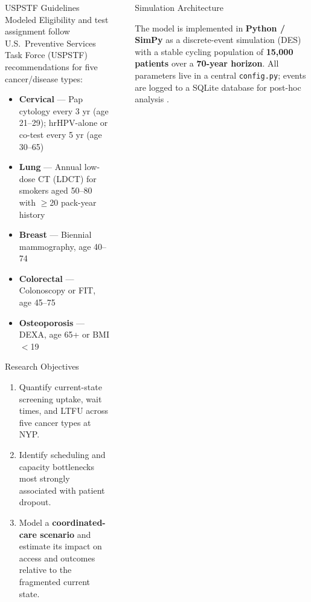 \documentclass[final]{beamer}
\newlength{\sepwidth}
\newlength{\colwidth}
\newcommand{\separatorcolumn}{\begin{column}{\sepwidth}\end{column}}
\begin{document}
\begin{frame}[t]
\begin{columns}[t]
\begin{column}{\colwidth}
\begin{block}{USPSTF Guidelines Modeled}
    Eligibility and test assignment follow U.S.\ Preventive Services Task
    Force (USPSTF) recommendations for five cancer/disease types:

    \begin{itemize}
      \item \textbf{Cervical} — Pap cytology every 3 yr (age 21--29);
            hrHPV-alone or co-test every 5 yr (age 30--65)
      \item \textbf{Lung} — Annual low-dose CT (LDCT) for smokers aged
            50--80 with $\geq$20 pack-year history
      \item \textbf{Breast} — Biennial mammography, age 40--74
      \item \textbf{Colorectal} — Colonoscopy or FIT, age 45--75
      \item \textbf{Osteoporosis} — DEXA, age 65+ or BMI $<$19
    \end{itemize}

  \end{block}

  \begin{alertblock}{Research Objectives}

    \begin{enumerate}
      \item Quantify current-state screening uptake, wait times, and LTFU
            across five cancer types at NYP.
      \item Identify scheduling and capacity bottlenecks most strongly
            associated with patient dropout.
      \item Model a \textbf{coordinated-care scenario} and estimate its
            impact on access and outcomes relative to the fragmented
            current state.
    \end{enumerate}

  \end{alertblock}

\end{column}

\separatorcolumn


\begin{column}{\colwidth}

  \begin{block}{Simulation Architecture}

    The model is implemented in \textbf{Python / SimPy} as a discrete-event
    simulation (DES) with a stable cycling population of \textbf{15{,}000
    patients} over a \textbf{70-year horizon}. All parameters live in a
    central \texttt{config.py}; events are logged to a SQLite database for
    post-hoc analysis \cite{kuruppu2025}.


\end{block}
\end{column}
\end{columns}
\end{frame}
\end{document}
